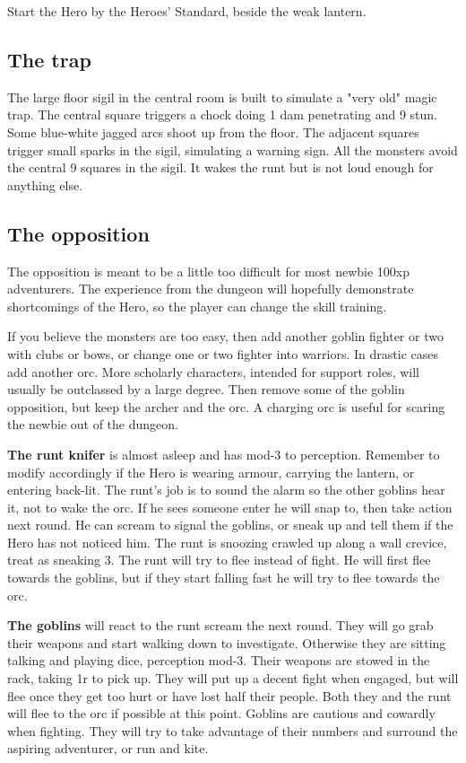 Start the Hero by the Heroes' Standard, beside the weak lantern.


\subsection*{The trap}

The large floor sigil in the central room is built to simulate a "very old" magic trap. The central square triggers a chock doing 1 dam penetrating and 9 stun. Some blue-white jagged arcs shoot up from the floor. The adjacent squares trigger small sparks in the sigil, simulating a warning sign. All the monsters avoid the central 9 squares in the sigil. It wakes the runt but is not loud enough for anything else.


\subsection*{The opposition}

The opposition is meant to be a little too difficult for most newbie 100xp adventurers. The experience from the dungeon will hopefully demonstrate shortcomings of the Hero, so the player can change the skill training.

If you believe the monsters are too easy, then add another goblin fighter or two with clubs or bows, or change one or two fighter into warriors. In drastic cases add another orc.
More scholarly characters, intended for support roles, will usually be outclassed by a large degree. Then remove some of the goblin opposition, but keep the archer and the orc. A charging orc is useful for scaring the newbie out of the dungeon.

\textbf{The runt knifer} is almost asleep and has mod-3 to perception. Remember to modify accordingly if the Hero is wearing armour, carrying the lantern, or entering back-lit. The runt's job is to sound the alarm so the other goblins hear it, not to wake the orc. If he sees someone enter he will snap to, then take action next round. He can scream to signal the goblins, or sneak up and tell them if the Hero has not noticed him. The runt is snoozing crawled up along a wall crevice, treat as sneaking 3.
The runt will try to flee instead of fight. He will first flee towards the goblins, but if they start falling fast he will try to flee towards the orc.

\textbf{The goblins} will react to the runt scream the next round. They will go grab their weapons and start walking down to investigate. Otherwise they are sitting talking and playing dice, perception mod-3. Their weapons are stowed in the rack, taking 1r to pick up.
They will put up a decent fight when engaged, but will flee once they get too hurt or have lost half their people. Both they and the runt will flee to the orc if possible at this point.
Goblins are cautious and cowardly when fighting. They will try to take advantage of their numbers and surround the aspiring adventurer, or run and kite.

